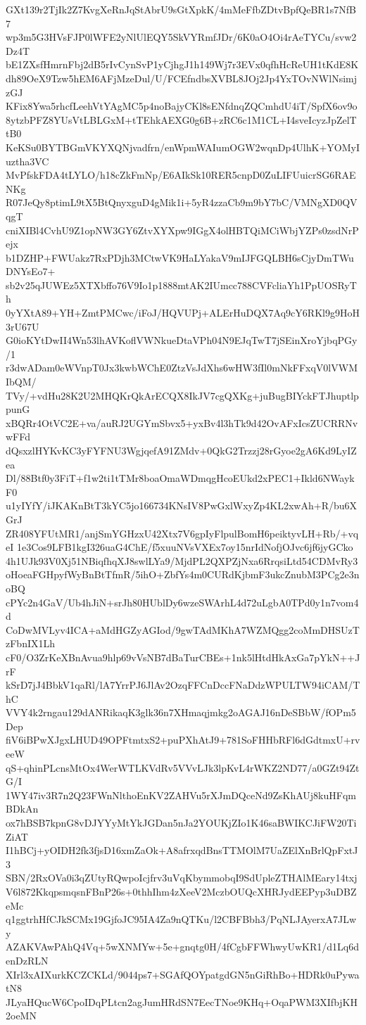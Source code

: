 GXt139r2TjIk2Z7KvgXeRnJqStAbrU9sGtXpkK/4mMeFfbZDtvBpfQeBR1s7NfB7
wp3m5G3HVsFJP0lWFE2yNlUlEQY5SkVYRmfJDr/6K0aO4Oi4rAeTYCu/svw2Dz4T
bE1ZXsfHmrnFbj2dB5rIvCynSvP1yCjhgJ1h149Wj7r3EVx0qfhHcReUH1tKdE8K
dh89OeX9Tzw5hEM6AFjMzeDul/U/FCEfndbsXVBL8JOj2Jp4YxTOvNWlNsimjzGJ
KFix8Ywa5rhcfLeehVtYAgMC5p4noBajyCKl8sENfdnqZQCmhdU4iT/SpfX6ov9o
8ytzbPFZ8YUsVtLBLGxM+tTEhkAEXG0g6B+zRC6c1M1CL+I4sveIcyzJpZelTtB0
KeKSu0BYTBGmVKYXQNjvadfrn/enWpmWAIumOGW2wqnDp4UlhK+YOMyIuztha3VC
MvPfskFDA4tLYLO/h18cZkFmNp/E6AIkSk10RER5cnpD0ZuLIFUuicrSG6RAENKg
R07JeQy8ptimL9tX5BtQnyxguD4gMik1i+5yR4zzaCb9m9bY7bC/VMNgXD0QVqgT
cniXIBl4CvhU9Z1opNW3GY6ZtvXYXpw9IGgX4olHBTQiMCiWbjYZPs0zsdNrPejx
b1DZHP+FWUakz7RxPDjh3MCtwVK9HaLYakaV9mIJFGQLBH6sCjyDmTWuDNYsEo7+
sb2v25qJUWEz5XTXbffo76V9Io1p1888mtAK2IUmcc788CVFcliaYh1PpUOSRyTh
0yYXtA89+YH+ZmtPMCwc/iFoJ/HQVUPj+ALErHuDQX7Aq9cY6RKl9g9HoH3rU67U
G0ioKYtDwII4Wn53lhAVKoflVWNkueDtaVPh04N9EJqTwT7jSEinXroYjbqPGy/1
r3dwADam0eWVnpT0Jx3kwbWChE0ZtzVsJdXhs6wHW3fIl0mNkFFxqV0lVWMIbQM/
TVy/+vdHu28K2U2MHQKrQkArECQX8IkJV7cgQXKg+juBugBIYckFTJhuptlppunG
xBQRr4OtVC2E+va/auRJ2UGYmSbvx5+yxBv4l3hTk9d42OvAFxIcsZUCRRNvwFFd
dQsxzlHYKvKC3yFYFNU3WgjqefA91ZMdv+0QkG2Trzzj28rGyoe2gA6Kd9LyIZea
Dl/88Btf0y3FiT+f1w2ti1tTMr8boaOmaWDmqgHcoEUkd2xPEC1+Ikld6NWaykF0
u1yIYfY/iJKAKnBtT3kYC5jo166734KNsIV8PwGxlWxyZp4KL2xwAh+R/bu6XGrJ
ZR408YFUtMR1/anjSmYGHzxU42Xtx7V6gpIyFlpulBomH6peiktyvLH+Rb/+vqeI
1e3Cos9LFB1kgI326uaG4ChE/f5xuuNVsVXEx7oy15nrIdNofjOJvc6jf6jyGCko
4h1UJk93V0Xj51NBiqfhqXJ8swlLYa9/MjdPL2QXPZjNxa6RrqsiLtd54CDMvRy3
oHoeaFGHpyfWyBnBtTfmR/5ihO+ZbfYs4m0CURdKjbmF3ukcZnubM3PCg2e3noBQ
cPYc2n4GaV/Ub4hJiN+srJh80HUblDy6wzeSWArhL4d72uLgbA0TPd0y1n7vom4d
CoDwMVLyv4ICA+aMdHGZyAGIod/9gwTAdMKhA7WZMQgg2coMmDHSUzTzFbnIX1Lh
cF0/O3ZrKeXBnAvua9hlp69vVsNB7dBaTurCBEs+1nk5lHtdHkAxGa7pYkN++JrF
kSrD7jJ4BbkV1qaRl/lA7YrrPJ6JlAv2OzqFFCnDccFNaDdzWPULTW94iCAM/ThC
VVY4k2rngau129dANRikaqK3glk36n7XHmaqjmkg2oAGAJ16nDeSBbW/fOPm5Dep
fiV6iBPwXJgxLHUD49OPFtmtxS2+puPXhAtJ9+781SoFHHbRFl6dGdtmxU+rveeW
qS+qhinPLcnsMtOx4WerWTLKVdRv5VVvLJk3lpKvL4rWKZ2ND77/a0GZt94ZtG/I
1WY47iv3R7n2Q23FWnNlthoEnKV2ZAHVu5rXJmDQceNd9ZsKhAUj8kuHFqmBDkAn
ox7hBSB7kpnG8vDJYYyMtYkJGDan5nJa2YOUKjZIo1K46saBWIKCJiFW20TiZiAT
I1hBCj+yOIDH2fk3fjsD16xmZaOk+A8afrxqdBnsTTMOlM7UaZElXnBrlQpFxtJ3
SBN/2RxOVa0i3qZUtyRQwpoIcjfrv3uVqKbymmobqI9SdUpleZTHAlMEary14txj
V6l872KkqpsmqsnFBnP26s+0thhIhm4zXeeV2MczbOUQcXHRJydEEPyp3uDBZeMc
q1ggtrhHfCJkSCMx19GjfoJC95IA4Za9nQTKu/l2CBFBbh3/PqNLJAyerxA7JLwy
AZAKVAwPAhQ4Vq+5wXNMYw+5e+gnqtg0H/4fCgbFFWhwyUwKR1/d1Lq6denDzRLN
XIrl3xAIXurkKCZCKLd/9044ps7+SGAfQOYpatgdGN5nGiRhBo+HDRk0uPywatN8
JLyaHQucW6CpoIDqPLtcn2agJumHRdSN7EecTNoe9KHq+OqaPWM3XIfbjKH2oeMN
